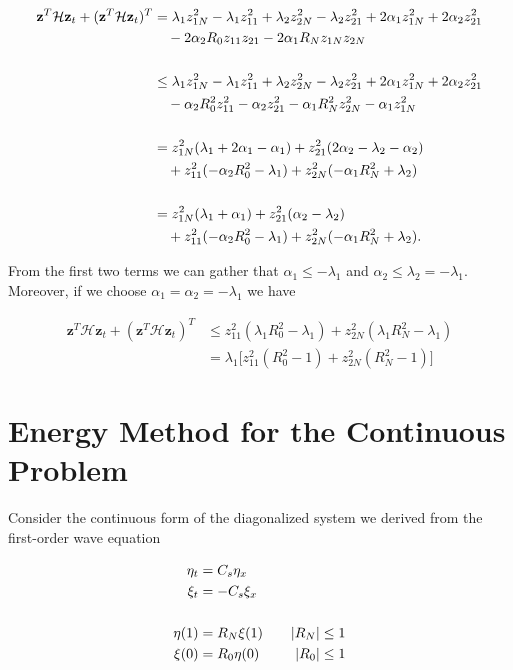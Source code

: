 \documentclass[12pt]{article}
\begin{document}
\begin{flushleft}
\begin{align*}
\mathbf{z}^{T} \mathcal{H} \mathbf{z}_t + (\mathbf{z}^{T}\mathcal{H} \mathbf{z}_t)^{T} &=  \lambda_1 z_{1N}^2 - \lambda_1 z_{11}^2 + \lambda_2 z_{2N}^2 - \lambda_2 z_{21}^2
+ 2\alpha_1 z_{1N}^2 + 2 \alpha_2 z_{21}^2\\
& \quad - 2\alpha_2 R_0 z_{11}z_{21} - 2\alpha_1 R_N z_{1N}z_{2N}\\
\vspace{0.25cm}\\
&\leq \lambda_1 z_{1N}^2 - \lambda_1 z_{11}^2 + \lambda_2 z_{2N}^2 - \lambda_2 z_{21}^2
+ 2\alpha_1 z_{1N}^2 + 2 \alpha_2 z_{21}^2\\
& \quad -\alpha_2 R_0^2 z_{11}^2 -  \alpha_2 z_{21}^2 -\alpha_1 R_N^2 z_{2N}^2 -\alpha_1  z_{1N}^2\\
\vspace{0.25cm}\\
&= z_{1N}^2 ( \lambda_1 + 2\alpha_1 - \alpha_1) + z_{21}^2(2\alpha_2 -\lambda_2 -\alpha_2)\\
& \quad +z_{11}^2(-\alpha_2 R_0^2 - \lambda_1) + z_{2N}^2(-\alpha_1 R_N^2 + \lambda_2)\\
\vspace{0.25cm}\\
&= z_{1N}^2 ( \lambda_1 + \alpha_1) + z_{21}^2(\alpha_2 -\lambda_2 )\\
& \quad +z_{11}^2(-\alpha_2 R_0^2 - \lambda_1) + z_{2N}^2(-\alpha_1 R_N^2 + \lambda_2).
\end{align*}

From the first two terms we can gather that $\alpha_1 \leq -\lambda_1$ and $\alpha_2 \leq \lambda_2 = -\lambda_1$. Moreover, if we choose $\alpha_1 = \alpha_2 = -\lambda_1$ we have

\begin{align*}
\mathbf{z}^{T} \mathcal{H} \mathbf{z}_t + (\mathbf{z}^{T}\mathcal{H} \mathbf{z}_t)^{T} &\leq z_{11}^2 ( \lambda_1 R_0^2 - \lambda_1) + z_{2N}^2(\lambda_1 R_N^2 - \lambda_1)\\
&= \lambda_1 \big [ z_{11}^2(R_0^2 - 1) + z_{2N}^2( R_N^2 - 1) \big ]
\end{align*}

\section*{Energy Method for the Continuous Problem}
Consider the continuous form of the diagonalized system we derived from the first-order wave equation

\begin{align*}
\eta_t &= C_s \eta_x  \\
\xi_t &= -C_s \xi_x\\
\vspace{0.25cm}\\
\eta(1) &= R_N \xi(1) \quad &|R_N| \leq 1 \\
\xi(0) &= R_0 \eta(0) \quad &|R_0| \leq 1 \\
\end{align*}


\end{flushleft}
\end{document}

